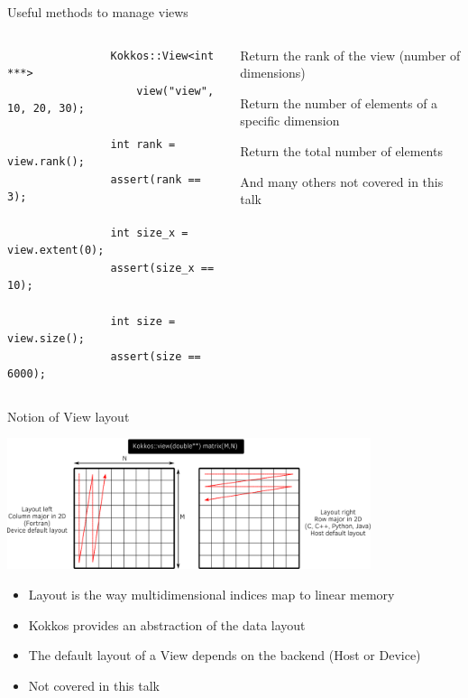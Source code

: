 \documentclass[
    aspectratio=169,
]{beamer}
\begin{document}
\begin{frame}[fragile]{Useful methods to manage views}
    \begin{columns}
        \begin{column}{0.45\linewidth}
            \begin{verbatim}
                Kokkos::View<int ***>
                    view("view", 10, 20, 30);

                int rank = view.rank();
                assert(rank == 3);

                int size_x = view.extent(0);
                assert(size_x == 10);

                int size = view.size();
                assert(size == 6000);
            \end{verbatim}
        \end{column}
        \begin{column}{0.55\linewidth}
            \begin{description}
                \item[\texttt{rank()}] Return the rank of the view (number of dimensions)
                \item[\texttt{extent(dim)}] Return the number of elements of a specific dimension
                \item[\texttt{size()}] Return the total number of elements
            \end{description}

            \vspace{0.5em}

            And many others not covered in this talk
        \end{column}
    \end{columns}
\end{frame}


\begin{frame}{Notion of View layout}
    \begin{center}
        \includegraphics[width=0.8\textwidth]{layout_right_left.png}
    \end{center}
    \begin{itemize}
        \item Layout is the way multidimensional indices map to linear memory
        \item Kokkos provides an abstraction of the data layout
        \item The default layout of a View depends on the backend (Host or Device)
        \item Not covered in this talk
    \end{itemize}
\end{frame}
\end{document}
